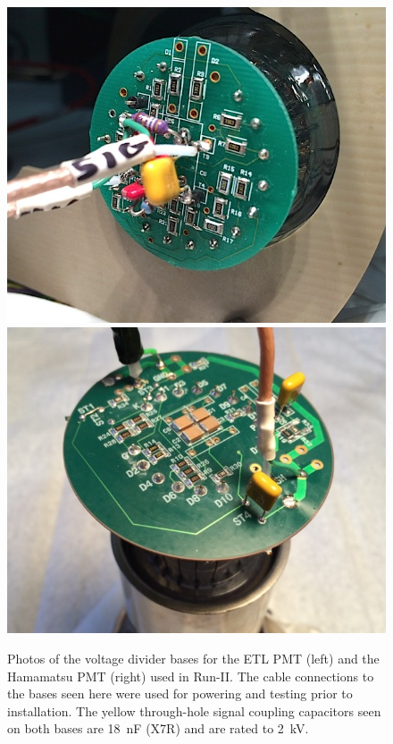 \begin{figure}
\centering
\includegraphics[height=0.25\textheight]{Chapter-3/Images/lightsys_etlbase.jpeg}
\hspace{0.5cm}
\includegraphics[height=0.25\textheight]{Chapter-3/Images/lightsys_hmmbase.jpg}
\caption{\label{voltagedividers}Photos of the voltage divider bases for the ETL PMT (left) and the Hamamatsu PMT (right) used in Run-II.  The cable connections to the bases seen here were used for powering and testing prior to installation.  The yellow through-hole signal coupling capacitors seen on both bases are 18~nF (X7R) and are rated to 2~kV.}
\end{figure}
